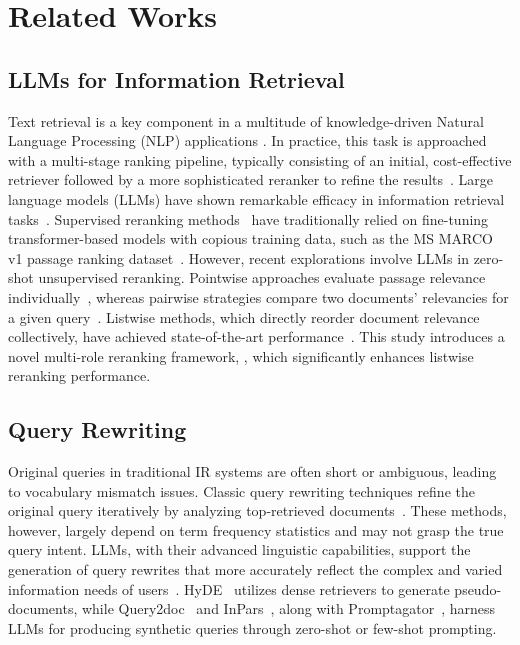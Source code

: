 \section{Related Works}
\subsection{LLMs for Information Retrieval}
Text retrieval is a key component in a multitude of knowledge-driven Natural Language Processing (NLP) applications \citep{jin2024learning,jin2024apeer,wu2024cg}. In practice, this task is approached with a multi-stage ranking pipeline, typically consisting of an initial, cost-effective retriever followed by a more sophisticated reranker to refine the results~\citep{ma2023zero, craswell2020overview, nogueira2019multi}. Large language models (LLMs) have shown remarkable efficacy in information retrieval tasks~\citep{zhu2023large, sun2023chatgpt, pradeep2023rankzephyr}. Supervised reranking methods~\citep{nogueira2020document, zhuang2023rankt5, pradeep2023rankzephyr} have traditionally relied on fine-tuning transformer-based models with copious training data, such as the MS MARCO v1 passage ranking dataset~\citep{bajaj2016ms}. However, recent explorations involve LLMs in zero-shot unsupervised reranking. Pointwise approaches evaluate passage relevance individually~\citep{sachan2022improving, liang2022holistic}, whereas pairwise strategies compare two documents' relevancies for a given query~\citep{qin2023large, sun2023instruction}. Listwise methods, which directly reorder document relevance collectively, have achieved state-of-the-art performance~\citep{sun2023chatgpt, ma2023zero}. This study introduces a novel multi-role reranking framework, \ours, which significantly enhances listwise reranking performance.


\subsection{Query Rewriting}
Original queries in traditional IR systems are often short or ambiguous, leading to vocabulary mismatch issues. Classic query rewriting techniques refine the original query iteratively by analyzing top-retrieved documents~\citep{abdul2004umass, metzler2005markov, zhai2001model, metzler2007latent}. These methods, however, largely depend on term frequency statistics and may not grasp the true query intent. LLMs, with their advanced linguistic capabilities, support the generation of query rewrites that more accurately reflect the complex and varied information needs of users~\citep{mao2023large, gao2023precise, jagerman2023query, ma2023query}. HyDE~\citep{gao2023precise} utilizes dense retrievers to generate pseudo-documents, while Query2doc~\citep{wang2023query2doc} and InPars~\citep{bonifacio2022inpars}, along with Promptagator~\citep{dai2022promptagator}, harness LLMs for producing synthetic queries through zero-shot or few-shot prompting.


